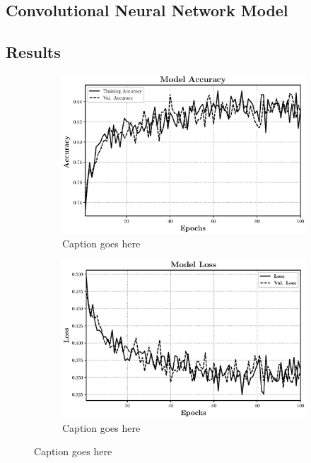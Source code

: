 \documentclass[11pt]{article}
\begin{document}
\subsection{Convolutional Neural Network Model}
\lipsum[2]
\subsection{Results}
\begin{figure}
\centering
\begin{subfigure}[b]{0.4\textwidth}
\includegraphics[width = \textwidth]{fig/acc}
\caption{Caption goes here}
\label{fig:acc}
\end{subfigure}
\begin{subfigure}[b]{0.4\textwidth}
\includegraphics[width = \textwidth]{fig/loss}
\caption{Caption goes here}
\label{fig:loss}
\end{subfigure}
\end{figure}
\end{document}
